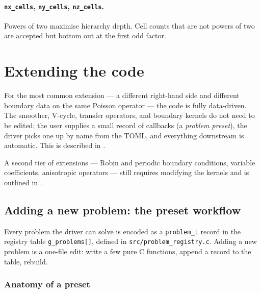 \documentclass[11pt]{article}
\theoremstyle{definition}
\begin{document}
\paragraph{\texttt{nx\_cells}, \texttt{ny\_cells}, \texttt{nz\_cells}.}
Powers of two maximise hierarchy depth.  Cell counts that are not
powers of two are accepted but bottom out at the first odd factor.

\section{Extending the code}\label{sec:extension}

For the most common extension --- a different right-hand side and
different boundary data on the same Poisson operator --- the code is
fully data-driven.  The smoother, V-cycle, transfer operators, and
boundary kernels do not need to be edited; the user supplies a small
record of callbacks (a \emph{problem preset}), the driver picks one up
by name from the TOML, and everything downstream is automatic.  This
is described in .

A second tier of extensions --- Robin and periodic boundary conditions,
variable coefficients, anisotropic operators --- still requires
modifying the kernels and is outlined in
.

\subsection{Adding a new problem: the preset workflow}\label{sec:adding-preset}

Every problem the driver can solve is encoded as a \texttt{problem\_t}
record in the registry table \texttt{g\_problems[]}, defined in
\texttt{src/problem\_registry.c}.  Adding a new problem is a one-file
edit: write a few pure C functions, append a record to the table,
rebuild.

\subsubsection{Anatomy of a preset}
\end{document}

